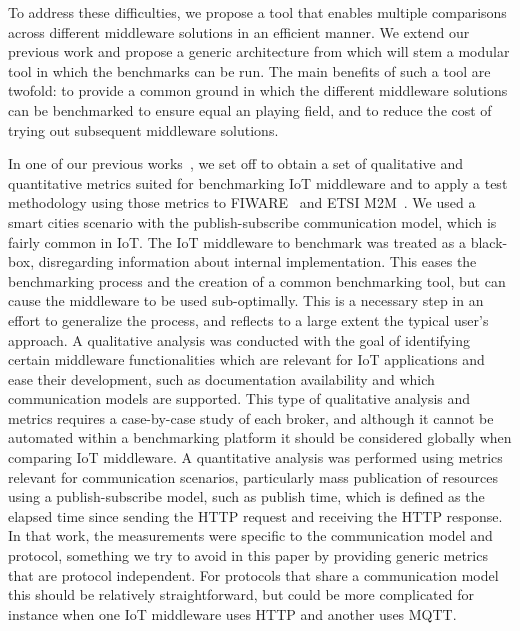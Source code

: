 \documentclass[conference]{IEEEtran}
\begin{document}
To address these difficulties, we propose a tool that enables multiple comparisons across different middleware solutions in an efficient manner. We extend our previous work and propose a generic architecture from which will stem a modular tool in which the benchmarks can be run. The main benefits of such a tool are twofold: to provide a common ground in which the different middleware solutions can be benchmarked to ensure equal an playing field, and to reduce the cost of trying out subsequent middleware solutions.  

In one of our previous works~\cite{cardoso_benchmarking_2017}, we set off to obtain a set of qualitative and quantitative metrics suited for benchmarking IoT middleware and to apply a test methodology using those metrics to FIWARE~\cite{FIWARE27:online} and ETSI M2M~\cite{ETSIWelc14:online}. %
We used a smart cities scenario with the publish-subscribe communication model, which is fairly common in IoT. The IoT middleware to benchmark was treated as a black-box, disregarding information about internal implementation. This eases the benchmarking process and the creation of a common benchmarking tool, but can cause the middleware to be used sub-optimally. This is a necessary step in an effort to generalize the process, and reflects to a large extent the typical user's approach. A qualitative analysis was conducted with the goal of identifying certain middleware functionalities which are relevant for IoT applications and ease their development, such as documentation availability and which communication models are supported. This type of qualitative analysis and metrics requires a case-by-case study of each broker, and although it cannot be automated within a benchmarking platform it should be considered globally when comparing IoT middleware. A quantitative analysis was performed using metrics relevant for communication scenarios, particularly mass publication of resources using a publish-subscribe model, such as publish time, which is defined as the elapsed time since sending the HTTP request and receiving the HTTP response. In that work, the measurements were specific to the communication model and protocol, something we  try to avoid in this paper by providing generic metrics that are protocol independent. For protocols that share a communication model this should be relatively straightforward, but could be more complicated for instance when one IoT middleware uses HTTP and another uses MQTT\@.
\end{document}
